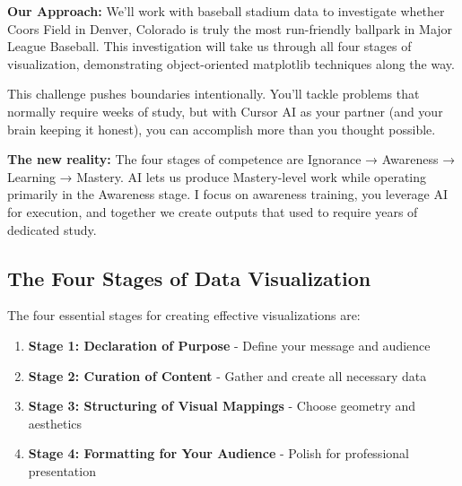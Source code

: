 \documentclass[
  letterpaper,
  DIV=11,
  numbers=noendperiod]{scrartcl}
\providecommand{\tightlist}{%
  \setlength{\itemsep}{0pt}\setlength{\parskip}{0pt}}
\begin{document}
\textbf{Our Approach:} We'll work with baseball stadium data to
investigate whether Coors Field in Denver, Colorado is truly the most
run-friendly ballpark in Major League Baseball. This investigation will
take us through all four stages of visualization, demonstrating
object-oriented matplotlib techniques along the way.

\begin{tcolorbox}[enhanced jigsaw, rightrule=.15mm, coltitle=black, colbacktitle=quarto-callout-warning-color!10!white, opacitybacktitle=0.6, arc=.35mm, leftrule=.75mm, colback=white, title=\textcolor{quarto-callout-warning-color}{\faExclamationTriangle}\hspace{0.5em}{⚠️ AI Partnership Required}, colframe=quarto-callout-warning-color-frame, bottomrule=.15mm, left=2mm, opacityback=0, toptitle=1mm, titlerule=0mm, toprule=.15mm, bottomtitle=1mm, breakable]

This challenge pushes boundaries intentionally. You'll tackle problems
that normally require weeks of study, but with Cursor AI as your partner
(and your brain keeping it honest), you can accomplish more than you
thought possible.

\textbf{The new reality:} The four stages of competence are Ignorance →
Awareness → Learning → Mastery. AI lets us produce Mastery-level work
while operating primarily in the Awareness stage. I focus on awareness
training, you leverage AI for execution, and together we create outputs
that used to require years of dedicated study.

\end{tcolorbox}

\subsection{The Four Stages of Data
Visualization}\label{the-four-stages-of-data-visualization}

The four essential stages for creating effective visualizations are:

\begin{enumerate}
\def\labelenumi{\arabic{enumi}.}
\tightlist
\item
  \textbf{Stage 1: Declaration of Purpose} - Define your message and
  audience
\item
  \textbf{Stage 2: Curation of Content} - Gather and create all
  necessary data
\item
  \textbf{Stage 3: Structuring of Visual Mappings} - Choose geometry and
  aesthetics
\item
  \textbf{Stage 4: Formatting for Your Audience} - Polish for
  professional presentation
\end{enumerate}
\end{document}
